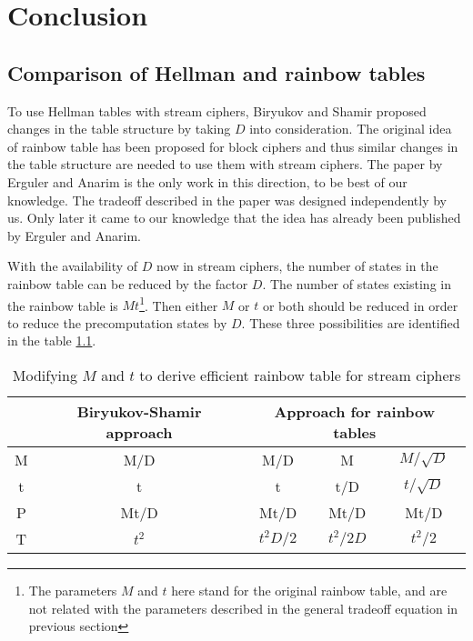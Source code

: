 \chapter{Conclusion}
\label{chap:conclusion}

\section{Comparison of Hellman and rainbow tables}
\label{sec:compare-hellman-rainbow}

To use Hellman tables with stream ciphers, Biryukov and Shamir proposed changes in the table structure by taking $D$ into consideration. The original idea of rainbow table has been proposed for block ciphers and thus similar changes in the table structure are needed to use them with stream ciphers. The paper \cite{erguler2005nct} by Erguler and Anarim is the only work in this direction, to be best of our knowledge. The tradeoff described in the paper was designed independently by us. Only later it came to our knowledge that the idea has already been published by Erguler and Anarim.

With the availability of $D$ now in stream ciphers, the number of states in the rainbow table can be reduced by the factor $D$. The number of states existing in the rainbow table is $Mt$\footnote{The parameters $M$ and $t$ here stand for the original rainbow table, and are not related with the parameters described in the general tradeoff equation in previous section}. Then either $M$ or $t$ or both should be reduced in order to reduce the precomputation states by $D$. These three possibilities are identified in the table \ref{tab:parameters-rainbow-table}. 

\begin{table}[ht!]
\begin{center}
\begin{tabular}{|c||c||c c c|}
\hline
			& Biryukov-Shamir approach 	& \multicolumn{3}{c|}{Approach for rainbow tables}					\\ \hline \hline
M			&	M/D		&	M/D				&	M						& $M/\sqrt{D}$	\\
t			&	t			&	t					&	t/D					& $t/\sqrt{D}$	\\ \hline \hline
P			&	Mt/D	&	Mt/D			&	Mt/D				& Mt/D					\\ 
T			&	$t^2$	&	$t^2D/2$	&	$t^2/2D$		& $t^2/2$				\\ \hline
\end{tabular}
\end{center} 
\caption{Modifying $M$ and $t$ to derive efficient rainbow table for stream ciphers}
\label{tab:parameters-rainbow-table}
\end{table}

